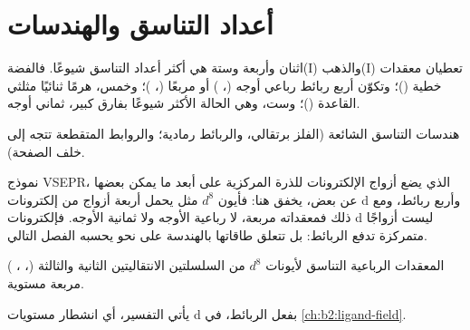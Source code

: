 \section{أعداد التناسق والهندسات}

اثنان وأربعة وستة هي أكثر أعداد التناسق شيوعًا. فالفضة(I) والذهب(I) تعطيان
معقدات خطية (\ce{[Ag(NH3)2]+})؛ وتكوّن أربع ربائط رباعي أوجه
(، ) أو مربعًا (، )؛
وخمس، هرمًا ثنائيًا مثلثي القاعدة ()؛ وست، وهي الحالة الأكثر شيوعًا بفارق كبير،
ثماني أوجه.

\begin{omfigure}

{\small هندسات التناسق الشائعة (الفلز برتقالي، والربائط رمادية؛ والروابط
المتقطعة تتجه إلى خلف الصفحة).}
\end{omfigure}

نموذج VSEPR، الذي يضع أزواج الإلكترونات للذرة المركزية على أبعد ما يمكن بعضها عن بعض،
يخفق هنا: فأيون $d^8$ مثل  يحمل أربعة أزواج من إلكترونات d وأربع
ربائط، ومع ذلك فمعقداته مربعة، لا رباعية الأوجه ولا ثمانية الأوجه. فإلكترونات
d ليست أزواجًا متمركزة تدفع الربائط: بل تتعلق طاقاتها
بالهندسة على نحو يحسبه الفصل التالي.

\begin{proposition}\label{prop:b2:coordination-complexes:square-planar}
المعقدات الرباعية التناسق لأيونات $d^8$ من السلسلتين الانتقاليتين الثانية والثالثة
(، ، ) مربعة مستوية.
\end{proposition}

\admitted

يأتي التفسير، أي انشطار مستويات d بفعل الربائط، في
\cref{ch:b2:ligand-field}.

